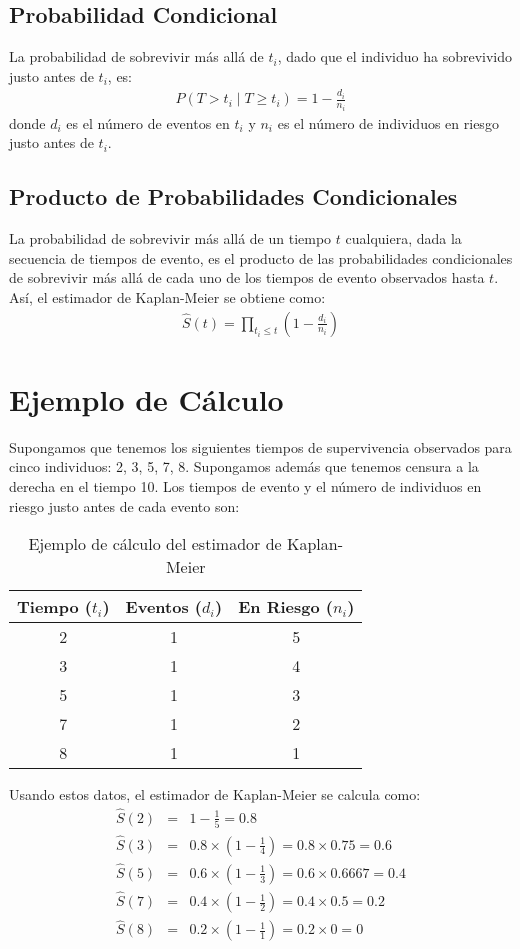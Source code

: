\documentclass[a4paper]{report} %
\begin{document}
\subsection{Probabilidad Condicional}
La probabilidad de sobrevivir m\'as all\'a de $t_i$, dado que el individuo ha sobrevivido justo antes de $t_i$, es:
\begin{eqnarray*}
P(T > t_i \mid T \geq t_i) = 1 - \frac{d_i}{n_i}
\end{eqnarray*}
donde $d_i$ es el n\'umero de eventos en $t_i$ y $n_i$ es el n\'umero de individuos en riesgo justo antes de $t_i$.

\subsection{Producto de Probabilidades Condicionales}
La probabilidad de sobrevivir m\'as all\'a de un tiempo $t$ cualquiera, dada la secuencia de tiempos de evento, es el producto de las probabilidades condicionales de sobrevivir m\'as all\'a de cada uno de los tiempos de evento observados hasta $t$. As\'i, el estimador de Kaplan-Meier se obtiene como:
\begin{eqnarray*}
\hat{S}(t) = \prod_{t_i \leq t} \left(1 - \frac{d_i}{n_i}\right)
\end{eqnarray*}

\section{Ejemplo de C\'alculo}
Supongamos que tenemos los siguientes tiempos de supervivencia observados para cinco individuos: 2, 3, 5, 7, 8. Supongamos adem\'as que tenemos censura a la derecha en el tiempo 10. Los tiempos de evento y el n\'umero de individuos en riesgo justo antes de cada evento son:

\begin{table}[h]
\centering
\begin{tabular}{|c|c|c|}
\hline
Tiempo ($t_i$) & Eventos ($d_i$) & En Riesgo ($n_i$) \\
\hline
2 & 1 & 5 \\
3 & 1 & 4 \\
5 & 1 & 3 \\
7 & 1 & 2 \\
8 & 1 & 1 \\
\hline
\end{tabular}
\caption{Ejemplo de c\'alculo del estimador de Kaplan-Meier}
\end{table}

Usando estos datos, el estimador de Kaplan-Meier se calcula como:
\begin{eqnarray*}
\hat{S}(2) &=& 1 - \frac{1}{5} = 0.8 \\
\hat{S}(3) &=& 0.8 \times \left(1 - \frac{1}{4}\right) = 0.8 \times 0.75 = 0.6 \\
\hat{S}(5) &=& 0.6 \times \left(1 - \frac{1}{3}\right) = 0.6 \times 0.6667 = 0.4 \\
\hat{S}(7) &=& 0.4 \times \left(1 - \frac{1}{2}\right) = 0.4 \times 0.5 = 0.2 \\
\hat{S}(8) &=& 0.2 \times \left(1 - \frac{1}{1}\right) = 0.2 \times 0 = 0 \\
\end{eqnarray*}
\end{document}
